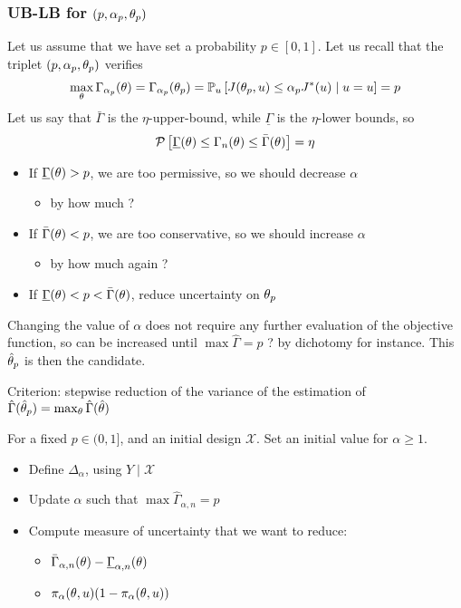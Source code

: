\documentclass[../../Main_ManuscritThese.tex]{subfiles}
\begin{document}
\subsubsection{UB-LB for $(p, \alpha_p, \theta_p)$}
Let us assume that we have set a probability $p\in [0,1]$. Let us recall that the triplet $(p, \alpha_p, \theta_p)$ verifies
\begin{align}
  \max_{\theta} \Gamma_{\alpha_p}(\theta) = \Gamma_{\alpha_p}(\theta_p) = \mathbb{P}_{u}\left[J(\theta_p,u) \leq \alpha_p J^*(u)\mid u = u\right] = p
\end{align}
Let us say that $\bar{\Gamma}$ is the $\eta$-upper-bound, while $\underline{\Gamma}$ is the $\eta$-lower bounds, so
\begin{equation}
  \mathcal{P}\left[\underline{\Gamma}(\theta) \leq \Gamma_n(\theta) \leq \bar{\Gamma}(\theta)\right] = \eta
\end{equation}
\begin{itemize}
\item If $\underline{\Gamma}(\theta)>p$, we are too permissive, so we should decrease $\alpha$
  \begin{itemize}
  \item by how much ?
  \end{itemize}
\item If $\bar{\Gamma}(\theta)<p$, we are too conservative, so we should increase $\alpha$
  \begin{itemize}
  \item by how much again ?
  \end{itemize}
 \item If $\underline{\Gamma}(\theta)<p<\bar{\Gamma}(\theta)$, reduce uncertainty on $\theta_p$
\end{itemize}
Changing the value of $\alpha$ does not require any further evaluation of the objective function, so can be increased until $\max \hat{\Gamma} = p$ ? by dichotomy for instance. This $\hat{\theta}_p$ is then the candidate.

Criterion: stepwise reduction of the variance of the estimation of $\hat{\Gamma}(\hat{\theta}_p) = \max_{\theta}\hat{\Gamma}(\hat{\theta})$

For a fixed $p\in (0, 1]$, and an initial design $\mathcal{X}$. Set an initial value for $\alpha \geq 1$. 
\begin{itemize}
\item Define $\Delta_{\alpha}$, using $Y \mid \mathcal{X}$
\item Update $\alpha$ such that $\max \hat{\Gamma}_{\alpha,n} = p$
\item Compute measure of uncertainty that we want to reduce:
  \begin{itemize}
  \item $\bar{\Gamma}_{\alpha,n}(\theta) - \underline{\Gamma}_{\alpha,n}(\theta)$
  \item $\pi_{\alpha}(\theta,u)(1-\pi_{\alpha}(\theta,u))$
  \end{itemize}
\end{itemize}
\end{document}
